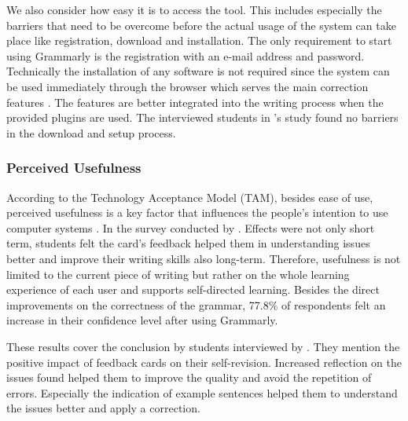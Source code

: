 \documentclass[runningheads]{llncs}
\let\OldTextregistered\textregistered
\renewcommand{\textregistered}{\OldTextregistered\xspace}%
\begin{document}
We also consider how easy it is to access the tool. This includes especially the barriers that need to be overcome before the actual usage of the system can take place like registration, download and installation. The only requirement to start using Grammarly\textregistered is the registration with an e-mail address and password. Technically the installation of any software is not required since the system can be used immediately through the browser which serves the main correction features \citep{noauthor_write_nodate}. The features are better integrated into the writing process when the provided plugins are used. The interviewed students in \citeauthor{nova_utilizing_2018}'s study found no barriers in the download and setup process.

\subsubsection{Perceived Usefulness} 
According to the Technology Acceptance Model (TAM), besides ease of use, perceived usefulness is a key factor that influences the people's intention to use computer systems \citep{davis_user_1989}. In the survey conducted by \citeauthor{cavaleri_you_2016} . Effects were not only short term, students felt the card's feedback helped them in understanding issues better and improve their writing skills also long-term. Therefore, usefulness is not limited to the current piece of writing but rather on the whole learning experience of each user and supports self-directed learning. Besides the direct improvements on the correctness of the grammar, 77.8\% of respondents felt an increase in their confidence level after using Grammarly\textregistered. 

These results cover the conclusion by students interviewed by \citep{nova_utilizing_2018}. They mention the positive impact of feedback cards on their self-revision. Increased reflection on the issues found helped them to improve the quality and avoid the repetition of errors. Especially the indication of example sentences helped them to understand the issues better and apply a correction.
\end{document}
